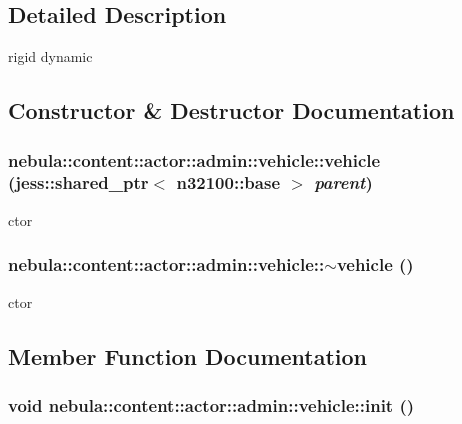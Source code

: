 \subsection{Detailed Description}
rigid dynamic 

\subsection{Constructor \& Destructor Documentation}
\hypertarget{classnebula_1_1content_1_1actor_1_1admin_1_1vehicle_a2ff847d718ed428a8296df23eb953b3c}{
\subsubsection[{vehicle}]{\setlength{\rightskip}{0pt plus 5cm}nebula::content::actor::admin::vehicle::vehicle (jess::shared\_\-ptr$<$ {\bf n32100::base} $>$ {\em parent})}}
\label{classnebula_1_1content_1_1actor_1_1admin_1_1vehicle_a2ff847d718ed428a8296df23eb953b3c}


ctor \hypertarget{classnebula_1_1content_1_1actor_1_1admin_1_1vehicle_a2f2f76ea458ae6c445e2effdacefe76b}{
\subsubsection[{$\sim$vehicle}]{\setlength{\rightskip}{0pt plus 5cm}nebula::content::actor::admin::vehicle::$\sim$vehicle ()}}
\label{classnebula_1_1content_1_1actor_1_1admin_1_1vehicle_a2f2f76ea458ae6c445e2effdacefe76b}


ctor 

\subsection{Member Function Documentation}
\hypertarget{classnebula_1_1content_1_1actor_1_1admin_1_1vehicle_affc4a941cb66e049f45e8de242c24535}{
\subsubsection[{init}]{\setlength{\rightskip}{0pt plus 5cm}void nebula::content::actor::admin::vehicle::init ()}}
\label{classnebula_1_1content_1_1actor_1_1admin_1_1vehicle_affc4a941cb66e049f45e8de242c24535}


